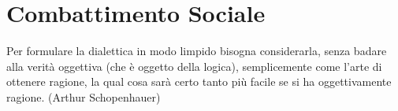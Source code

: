 \section{Combattimento Sociale}

\begin{changemargin}{0.3cm}{0.3cm}\begin{enfasi}{

Per formulare la dialettica in modo limpido bisogna considerarla, senza badare alla verità oggettiva (che è oggetto della logica), semplicemente come l'arte di ottenere ragione, la qual cosa sarà certo tanto più facile se si ha oggettivamente ragione. (Arthur Schopenhauer)

}\end{enfasi}\end{changemargin}


